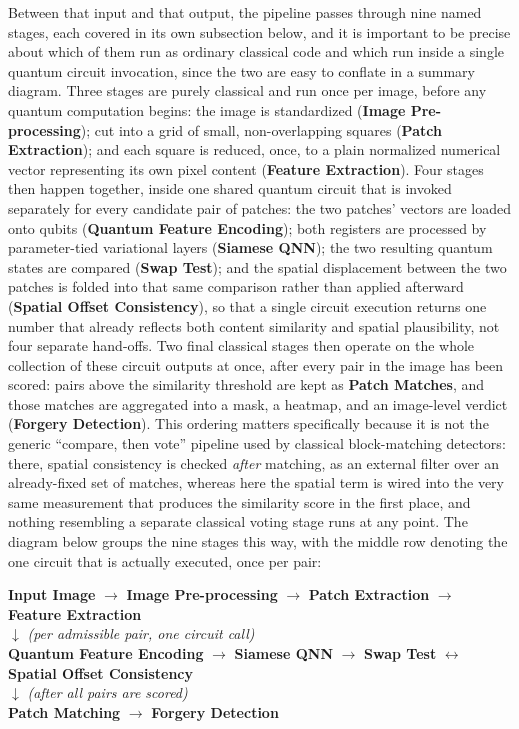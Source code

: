\documentclass[conference]{IEEEtran}
\begin{document}
Between that input and that output, the pipeline passes through nine named stages, each covered in its own subsection below, and it is important to be precise about which of them run as ordinary classical code and which run inside a single quantum circuit invocation, since the two are easy to conflate in a summary diagram. Three stages are purely classical and run once per image, before any quantum computation begins: the image is standardized (\textbf{Image Pre-processing}); cut into a grid of small, non-overlapping squares (\textbf{Patch Extraction}); and each square is reduced, once, to a plain normalized numerical vector representing its own pixel content (\textbf{Feature Extraction}). Four stages then happen together, inside one shared quantum circuit that is invoked separately for every candidate pair of patches: the two patches' vectors are loaded onto qubits (\textbf{Quantum Feature Encoding}); both registers are processed by parameter-tied variational layers (\textbf{Siamese QNN}); the two resulting quantum states are compared (\textbf{Swap Test}); and the spatial displacement between the two patches is folded into that same comparison rather than applied afterward (\textbf{Spatial Offset Consistency}), so that a single circuit execution returns one number that already reflects both content similarity and spatial plausibility, not four separate hand-offs. Two final classical stages then operate on the whole collection of these circuit outputs at once, after every pair in the image has been scored: pairs above the similarity threshold are kept as \textbf{Patch Matches}, and those matches are aggregated into a mask, a heatmap, and an image-level verdict (\textbf{Forgery Detection}). This ordering matters specifically because it is not the generic ``compare, then vote'' pipeline used by classical block-matching detectors: there, spatial consistency is checked \emph{after} matching, as an external filter over an already-fixed set of matches, whereas here the spatial term is wired into the very same measurement that produces the similarity score in the first place, and nothing resembling a separate classical voting stage runs at any point. The diagram below groups the nine stages this way, with the middle row denoting the one circuit that is actually executed, once per pair:

\begin{center}
\small
\textbf{Input Image} $\rightarrow$ \textbf{Image Pre-processing} $\rightarrow$ \textbf{Patch Extraction} $\rightarrow$\\
\textbf{Feature Extraction}\\
$\downarrow$ \emph{(per admissible pair, one circuit call)}\\
\textbf{Quantum Feature Encoding} $\rightarrow$ \textbf{Siamese QNN} $\rightarrow$ \textbf{Swap Test} $\leftrightarrow$\\
\textbf{Spatial Offset Consistency}\\
$\downarrow$ \emph{(after all pairs are scored)}\\
\textbf{Patch Matching} $\rightarrow$ \textbf{Forgery Detection}
\end{center}
\end{document}
